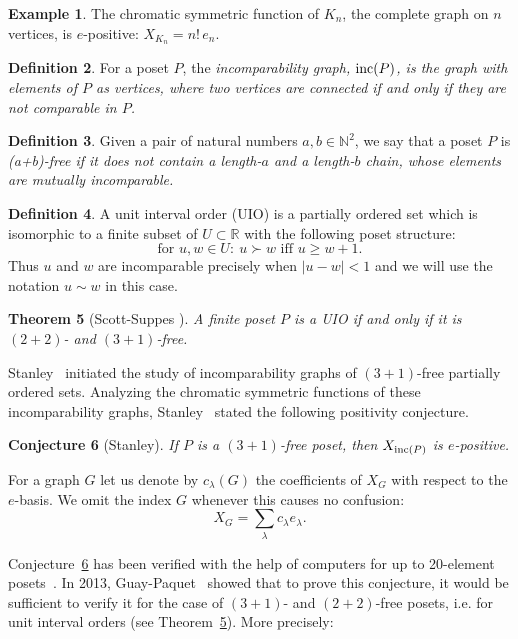 \documentclass{article}
\theoremstyle{plain}
\newtheorem{thm}{Theorem}[section]
\newtheorem{conj}[thm]{Conjecture}
\theoremstyle{definition}
\newtheorem{defn}[thm]{Definition}
\newtheorem{exmp}[thm]{Example}
\newcommand{\R}{\mathbb{R}}
\begin{document}
\begin{exmp}
  The chromatic symmetric function of $K_n$, the complete graph on $n$
  vertices, is $e$-positive: $X_{K_n} = n!\,e_n$.
\end{exmp}

\begin{defn} \label{incgraph} For a poset $P$, the \em incomparability
  graph\normalfont, $\textnormal{inc}(P)$, is the graph with elements
  of $P$ as vertices, where two vertices are connected if and only if
  they are not comparable in $P$.
\end{defn} 

\begin{defn} \label{nplusmfree} Given a pair of natural numbers
  $a,b\in\mathbb{N}^2$, we say that a poset $P$ is \em (a+b)-free
  \normalfont if it does not contain a length-$a$ and a length-$b$
  chain, whose elements are mutually incomparable.
\end{defn} 

\begin{defn} A unit interval order (UIO) is a partially ordered set
  which is isomorphic to a finite subset of $U\subset\R$ with the following poset structure:
\[ \text{for } u,w\in U:\    u\succ w \text{ iff } u\ge w+1.
\]
Thus $u$ and $w$ are incomparable precisely when $|u-w|<1$ and we will
use the notation $u\sim w$ in this case. 
\end{defn}
\begin{thm}[Scott-Suppes \cite{Scott-Suppes54}]\label{S_S}
A finite poset $P$ is a UIO if and only if it is $(2+2)$- and $(3+1)$-free.
\end{thm}


Stanley~\cite{Stanley95a} initiated the study of incomparability
graphs of $(3+1)$-free partially ordered sets. Analyzing the chromatic
symmetric functions of these incomparability graphs,
Stanley~\cite{Stanley95a} stated the following positivity conjecture.

\begin{conj}[Stanley] \label{eposconj}
If $P$ is a $(3+1)$-free poset, then $X_{\textnormal{inc}(P)}$ is $e$-positive.
\end{conj}

For a graph $G$ let us denote by ${c_\lambda}(G)$ the coefficients of $X_G$ with respect to the $e$-basis. We omit the index $G$ whenever this causes no confusion:
$$X_G=\sum\limits_{\lambda}c_{\lambda}e_\lambda.$$

Conjecture~\ref{eposconj} has been verified with the help of computers
for up to 20-element posets~\cite{Guay-Paquet13}. In 2013,
Guay-Paquet~\cite{Guay-Paquet13} showed that to prove this conjecture,
it would be sufficient to verify it for the case of $(3+1)$- and
$(2+2)$-free posets, i.e. for unit interval orders (see Theorem~\ref{S_S}). More precisely:
\end{document}
